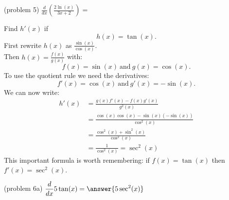\documentclass[handout]{ximera}
\begin{document}
\begin{center}
\begin{foldable}
\end{foldable}
\end{center}



\begin{problem}(problem 5)
  $\displaystyle{\frac{d}{dx} \left(\frac{2\ln(x)}{3x + 2}\right)=}$\\
  
  \begin{multipleChoice}
  \end{multipleChoice}
\end{problem}




\begin{example}[example 6]
Find $h'(x)$ if
\[
h(x) = \tan(x).
\]
First rewrite $h(x)$ as 
$\displaystyle{\frac{\sin(x)}{\cos(x)}}.$ \\
Then $\displaystyle{h(x) = \frac{f(x)}{g(x)}}$ with:
\[f(x) = \sin(x) \ \mbox{and} \  g(x)= \cos(x).\] 
To use the quotient rule we need the derivatives:
\[f'(x) = \cos(x) \ \mbox{and} \  g'(x) = -\sin(x).\]
We can now write: 
\begin{align*}
h'(x) &= \frac{g(x)f'(x) - f(x)g'(x)}{g^2(x)}\\
&= \frac{\cos(x)\cos(x) - \sin(x)(-\sin(x))}{\cos^2(x)}\\
&= \frac{\cos^2(x)+ \sin^2(x)}{\cos^2(x)}\\
&= \frac{1}{\cos^2(x)} = \sec^2(x)
\end{align*}
This important formula is worth remembering: if $f(x) = \tan(x)$ then $f'(x) =\sec^2(x)$.
\end{example}



\begin{center}
\begin{foldable}
\end{foldable}
\end{center}

\begin{problem}(problem 6a)
  $\displaystyle{\frac{d}{dx} 5\tan(x)= \answer{5\sec^2(x)}}$\\
\end{problem}
\end{document}
